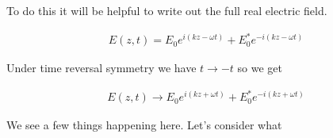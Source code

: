 \documentclass[12pt]{article}
\begin{document}
To do this it will be helpful to write out the full real electric field.

\begin{align}
E(z, t) = E_0e^{i(kz-\omega t)} + E_0^* e^{-i(kz-\omega t)}
\end{align}

Under time reversal symmetry we have $t\rightarrow -t$ so we get

\begin{align}
E(z,t) \rightarrow E_0e^{i(kz+\omega t)} + E_0^* e^{-i(kz+\omega t)}
\end{align}

We see a few things happening here.
Let's consider what 
\end{document}
